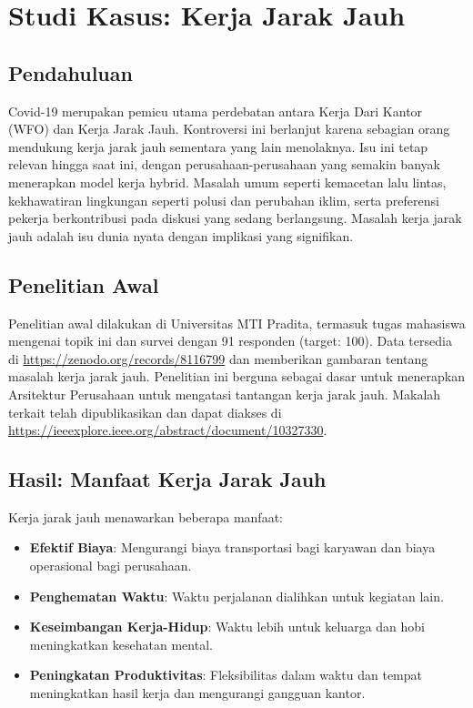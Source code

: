 \chapter{Studi Kasus: Kerja Jarak Jauh}

\section{Pendahuluan}

Covid-19 merupakan pemicu utama perdebatan antara Kerja Dari Kantor (WFO) dan Kerja Jarak Jauh. Kontroversi ini berlanjut karena sebagian orang mendukung kerja jarak jauh sementara yang lain menolaknya. Isu ini tetap relevan hingga saat ini, dengan perusahaan-perusahaan yang semakin banyak menerapkan model kerja hybrid. Masalah umum seperti kemacetan lalu lintas, kekhawatiran lingkungan seperti polusi dan perubahan iklim, serta preferensi pekerja berkontribusi pada diskusi yang sedang berlangsung. Masalah kerja jarak jauh adalah isu dunia nyata dengan implikasi yang signifikan.

\section{Penelitian Awal}

Penelitian awal dilakukan di Universitas MTI Pradita, termasuk tugas mahasiswa mengenai topik ini dan survei dengan 91 responden (target: 100). Data tersedia di \url{https://zenodo.org/records/8116799} dan memberikan gambaran tentang masalah kerja jarak jauh. Penelitian ini berguna sebagai dasar untuk menerapkan Arsitektur Perusahaan untuk mengatasi tantangan kerja jarak jauh. Makalah terkait telah dipublikasikan dan dapat diakses di \url{https://ieeexplore.ieee.org/abstract/document/10327330}.

\section{Hasil: Manfaat Kerja Jarak Jauh}

Kerja jarak jauh menawarkan beberapa manfaat:
\begin{itemize}
	\item \textbf{Efektif Biaya}: Mengurangi biaya transportasi bagi karyawan dan biaya operasional bagi perusahaan.
	\item \textbf{Penghematan Waktu}: Waktu perjalanan dialihkan untuk kegiatan lain.
	\item \textbf{Keseimbangan Kerja-Hidup}: Waktu lebih untuk keluarga dan hobi meningkatkan kesehatan mental.
	\item \textbf{Peningkatan Produktivitas}: Fleksibilitas dalam waktu dan tempat meningkatkan hasil kerja dan mengurangi gangguan kantor.
\end{itemize}

